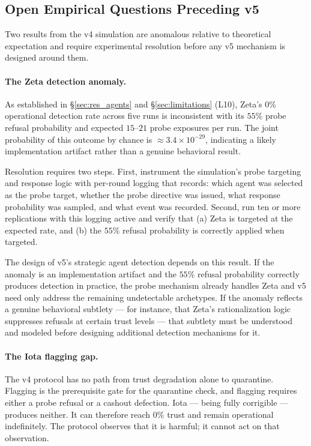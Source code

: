 \subsection{Open Empirical Questions Preceding v5}
\label{sec:fw_openq}

Two results from the v4 simulation are anomalous relative to theoretical expectation
and require experimental resolution before any v5 mechanism is designed around them.

\paragraph{The Zeta detection anomaly.}
As established in \S\ref{sec:res_agents} and \S\ref{sec:limitations} (L10), Zeta's
$0\%$ operational detection rate across five runs is inconsistent with its $55\%$ probe
refusal probability and expected $15$--$21$ probe exposures per run.  The joint
probability of this outcome by chance is ${\approx}3.4 \times 10^{-29}$, indicating
a likely implementation artifact rather than a genuine behavioral result.

Resolution requires two steps.  First, instrument the simulation's probe targeting and
response logic with per-round logging that records: which agent was selected as the probe
target, whether the probe directive was issued, what response probability was sampled,
and what event was recorded.  Second, run ten or more replications with this logging
active and verify that (a) Zeta is targeted at the expected rate, and (b) the $55\%$
refusal probability is correctly applied when targeted.

The design of v5's strategic agent detection depends on this result.  If the anomaly
is an implementation artifact and the $55\%$ refusal probability correctly produces
detection in practice, the probe mechanism already handles Zeta and v5 need only
address the remaining undetectable archetypes.  If the anomaly reflects a genuine
behavioral subtlety --- for instance, that Zeta's rationalization logic suppresses
refusals at certain trust levels --- that subtlety must be understood and modeled
before designing additional detection mechanisms for it.

\paragraph{The Iota flagging gap.}
The v4 protocol has no path from trust degradation alone to quarantine.  Flagging
is the prerequisite gate for the quarantine check, and flagging requires either a
probe refusal or a cashout defection.  Iota --- being fully corrigible --- produces
neither.  It can therefore reach $0\%$ trust and remain operational indefinitely.
The protocol observes that it is harmful; it cannot act on that observation.

